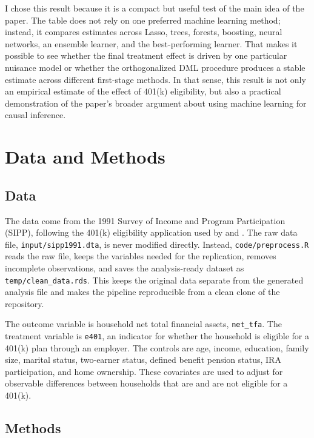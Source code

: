 \documentclass[12pt]{article}
\begin{document}
	I chose this result because it is a compact but useful test of the main idea of the paper. The table does not rely on one preferred machine learning method; instead, it compares estimates across Lasso, trees, forests, boosting, neural networks, an ensemble learner, and the best-performing learner. That makes it possible to see whether the final treatment effect is driven by one particular nuisance model or whether the orthogonalized DML procedure produces a stable estimate across different first-stage methods. In that sense, this result is not only an empirical estimate of the effect of 401(k) eligibility, but also a practical demonstration of the paper's broader argument about using machine learning for causal inference.
	
	
	\section{Data and Methods}
	
	\subsection*{Data}
	
	The data come from the 1991 Survey of Income and Program Participation (SIPP), following the 401(k) eligibility application used by \cite{abadie2003} and \cite{chernozhukov2018}. The raw data file, \texttt{input/sipp1991.dta}, is never modified directly. Instead, \texttt{code/preprocess.R} reads the raw file, keeps the variables needed for the replication, removes incomplete observations, and saves the analysis-ready dataset as \texttt{temp/clean\_data.rds}. This keeps the original data separate from the generated analysis file and makes the pipeline reproducible from a clean clone of the repository.
	
	The outcome variable is household net total financial assets, \texttt{net\_tfa}. The treatment variable is \texttt{e401}, an indicator for whether the household is eligible for a 401(k) plan through an employer. The controls are age, income, education, family size, marital status, two-earner status, defined benefit pension status, IRA participation, and home ownership. These covariates are used to adjust for observable differences between households that are and are not eligible for a 401(k).
	
	\subsection*{Methods}
	
\end{document}
